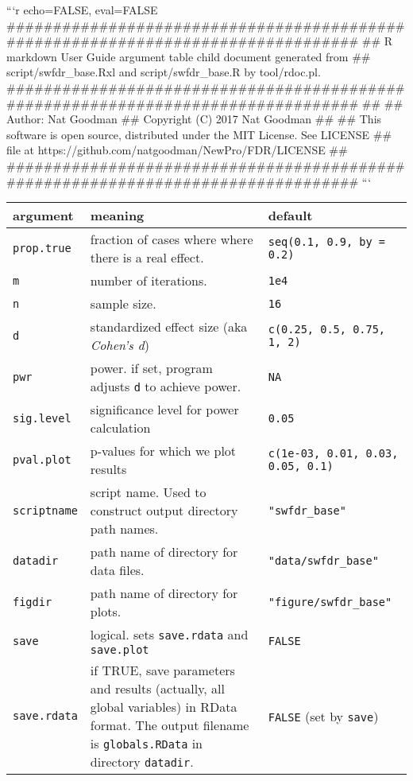 ```{r echo=FALSE, eval=FALSE}
#################################################################################
## R markdown User Guide argument table child document generated from 
## script/swfdr_base.Rxl and script/swfdr_base.R by tool/rdoc.pl.
#################################################################################
##
## Author:  Nat Goodman
## Copyright (C) 2017 Nat Goodman
##
## This software is open source, distributed under the MIT License. See LICENSE
## file at https://github.com/natgoodman/NewPro/FDR/LICENSE
##
#################################################################################
```
\begingroup
\setlength{\tabcolsep}{10pt}
\renewcommand{\arraystretch}{1.2}
\centering
\begin{tabular}{m{}m{}m{}}
\toprule
argument & meaning & default\\
\midrule
\texttt{prop.true} & fraction of cases where where there is a real effect. & \texttt{seq(0.1, 0.9, by = 0.2)} \\
\texttt{m} & number of iterations. & \texttt{1e4} \\
\texttt{n} & sample size. & \texttt{16} \\
\texttt{d} & standardized effect size (aka \textit{Cohen's d}) & \texttt{c(0.25, 0.5, 0.75, 1, 2)} \\
\texttt{pwr} & power. if set, program adjusts \texttt{d} to achieve power. & \texttt{NA} \\
\texttt{sig.level} & significance level for power calculation & \texttt{0.05} \\
\texttt{pval.plot} & p-values for which we plot results & \texttt{c(1e-03, 0.01, 0.03, 0.05, 0.1)} \\
\texttt{scriptname} & script name. Used to construct output directory path names. & \texttt{"swfdr\_base"} \\
\texttt{datadir} & path name of directory for data files. & \texttt{"data/swfdr\_base"} \\
\texttt{figdir} & path name of directory for plots. & \texttt{"figure/swfdr\_base"} \\
\texttt{save} & logical. sets \texttt{save.rdata} and \texttt{save.plot} & \texttt{FALSE} \\
\texttt{save.rdata} & if TRUE, save parameters and results (actually, all global variables) in RData format. The output filename is \texttt{globals.RData} in directory \texttt{datadir}. & \texttt{FALSE} (set by \texttt{save}) \\

\end{tabular}
